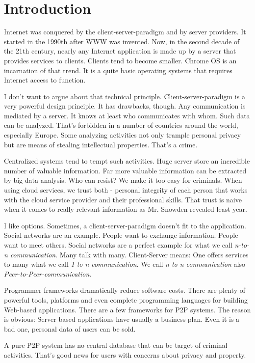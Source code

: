 \chapter{Introduction}
Internet was conquered by the client-server-paradigm and by server providers. It started in the 1990th after WWW was invented. Now, in the second decade of the 21th century, nearly any Internet application is made up by a server that provides services to clients. Clients tend to become smaller. Chrome OS is an incarnation of that trend. It is a quite basic operating systems that requires Internet access to function.

I don't want to argue about that technical principle. Client-server-paradigm is a very powerful design principle. It has drawbacks, though. Any communication is mediated by a server. It knows at least who communicates with whom. Such data can be analyzed. That's forbidden in a number of countries around the world, especially Europe. Some analyzing activities not only trample personal privacy but are means of stealing intellectual properties. That's a crime.

Centralized systems tend to tempt such activities. Huge server store an incredible number of valuable information. Far more valuable information can be extracted by big data analysis. Who can resist? We make it too easy for criminals. When using cloud services, we trust both - personal integrity of each person that works with the cloud service provider and their professional skills. That trust is naive when it comes to really relevant information as Mr. Snowden revealed least year.

I like options. Sometimes, a client-server-paradigm doesn't fit to the application. Social networks are an example. People want to exchange information. People want to meet others. Social networks are a perfect example for what we call {\it n-to-n communication}. Many talk with many. Client-Server means: One offers services to many what we call {\it 1-to-n communication}.
We call {\it n-to-n communication} also {\it Peer-to-Peer-communication}.

Programmer frameworks dramatically reduce software costs. There are plenty of powerful tools, platforms and even complete programming languages for building Web-based applications. There are a few frameworks for P2P systems. The reason is obvious: Server based applications have usually a business plan. Even it is a bad one, personal data of users can be sold. 

A pure P2P system has no central database that can be target of criminal activities. That's good news for users with concerns about privacy and property. 

